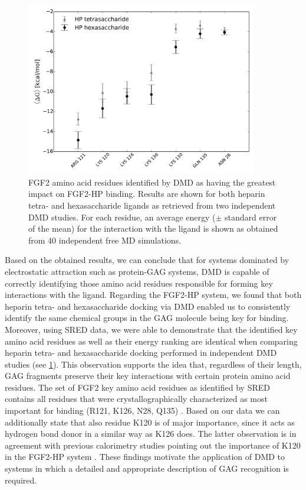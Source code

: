 \begin{figure}
\centering
\includegraphics[width=0.9\textwidth]{gfx/dmd/figure_6_receptor_top7_residues_of_top_40percent_dmd_runs.pdf}
\caption[]{
FGF2 amino acid residues identified by DMD as having the greatest impact on
FGF2-HP binding. Results are shown for both heparin tetra- and hexasaccharide
ligands as retrieved from two independent DMD studies. For each residue, an
average energy ($\pm$ standard error of the mean) for the interaction with the
ligand is shown as obtained from 40 independent free MD simulations.
}
\label{fig:dmd:sred_fgf2}
\end{figure}

Based on the obtained results, we can conclude that for systems dominated by
electrostatic attraction such as protein-GAG systems, DMD is capable of
correctly identifying those amino acid residues responsible for forming key
interactions with the ligand. Regarding the FGF2-HP system, we found that both
heparin tetra- and hexasaccharide docking via DMD enabled us to consistently
identify the same chemical groups in the GAG molecule being key for binding.
Moreover, using SRED data, we were able to demonstrate that the identified key
amino acid residues as well as their energy ranking are identical when comparing
heparin tetra- and hexasaccharide docking performed in independent DMD studies
(see \cref{fig:dmd:sred_fgf2}). This observation supports the idea that,
regardless of their length, GAG fragments preserve their key interactions with
certain protein amino acid residues. The set of FGF2 key amino acid residues as
identified by SRED contains all residues that were crystallographically
characterized as most important for binding (R121, K126, N28,
Q135) \cite{faham_heparin_1996}. Based on our data we can additionally state
that also residue K120 is of major importance, since it acts as hydrogen bond
donor in a similar way as K126 does. The latter observation is in agreement with
previous calorimetry studies pointing out the importance of K120 in the FGF2-HP
system \cite{thompson_1994_fgf2_heparin}. These findings motivate the
application of DMD to systems in which a detailed and appropriate description of
GAG recognition is required.



